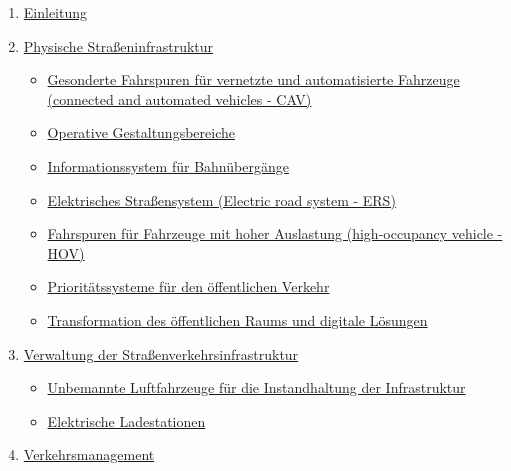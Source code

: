 \documentclass[
]{book}
\providecommand{\tightlist}{%
  \setlength{\itemsep}{0pt}\setlength{\parskip}{0pt}}
\begin{document}
\begin{enumerate}
\def\labelenumi{\arabic{enumi}.}
\tightlist
\item
  \protect\hyperlink{intro}{Einleitung}
\item
  \protect\hyperlink{infrastructure}{Physische Straßeninfrastruktur}

  \begin{itemize}
  \tightlist
  \item
    \protect\hyperlink{dedicated_lanes}{Gesonderte Fahrspuren für vernetzte und automatisierte Fahrzeuge (connected and automated vehicles - CAV)}\\
  \item
    \protect\hyperlink{ODD}{Operative Gestaltungsbereiche}\\
  \item
    \protect\hyperlink{rail_crossing_info_system}{Informationssystem für Bahnübergänge}\\
  \item
    \protect\hyperlink{ers}{Elektrisches Straßensystem (Electric road system - ERS)}\\
  \item
    \protect\hyperlink{high_occupancy}{Fahrspuren für Fahrzeuge mit hoher Auslastung (high-occupancy vehicle - HOV)}\\
  \item
    \protect\hyperlink{public_trans_priority}{Prioritätssysteme für den öffentlichen Verkehr}\\
  \item
    \protect\hyperlink{transformation_public_space}{Transformation des öffentlichen Raums und digitale Lösungen}\\
  \end{itemize}
\item
  \protect\hyperlink{highway}{Verwaltung der Straßenverkehrsinfrastruktur}

  \begin{itemize}
  \tightlist
  \item
    \protect\hyperlink{uav}{Unbemannte Luftfahrzeuge für die Instandhaltung der Infrastruktur}\\
  \item
    \protect\hyperlink{charging_station}{Elektrische Ladestationen}\\
  \end{itemize}
\item
  \protect\hyperlink{traffic}{Verkehrsmanagement}


\end{enumerate}
\end{document}
